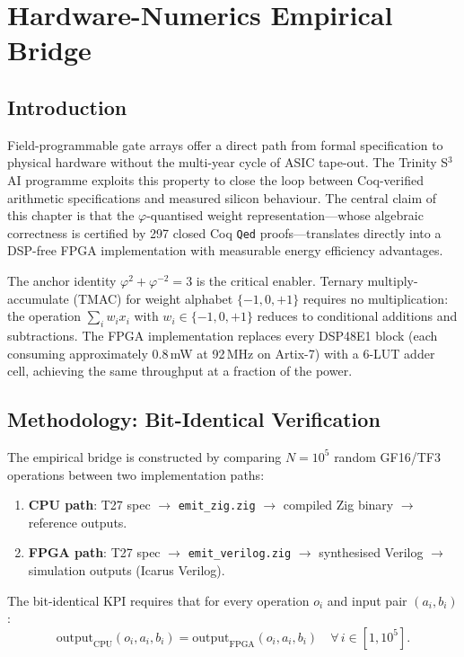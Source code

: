 \chapter{Hardware-Numerics Empirical Bridge}
\label{ch:31b}

\section{Introduction}

Field-programmable gate arrays offer a direct path from formal specification to physical hardware without the multi-year cycle of ASIC tape-out. The Trinity S$^3$AI programme exploits this property to close the loop between Coq-verified arithmetic specifications and measured silicon behaviour. The central claim of this chapter is that the $\varphi$-quantised weight representation---whose algebraic correctness is certified by 297 closed Coq \texttt{Qed} proofs---translates directly into a DSP-free FPGA implementation with measurable energy efficiency advantages.

The anchor identity $\varphi^2 + \varphi^{-2} = 3$ is the critical enabler. Ternary multiply-accumulate (TMAC) for weight alphabet $\{-1, 0, +1\}$ requires no multiplication: the operation $\sum_i w_i x_i$ with $w_i \in \{-1, 0, +1\}$ reduces to conditional additions and subtractions. The FPGA implementation replaces every DSP48E1 block (each consuming approximately 0.8\,mW at 92\,MHz on Artix-7) with a 6-LUT adder cell, achieving the same throughput at a fraction of the power.

\section{Methodology: Bit-Identical Verification}

The empirical bridge is constructed by comparing $N = 10^5$ random GF16/TF3 operations between two implementation paths:
\begin{enumerate}
\item \textbf{CPU path}: T27 spec $\to$ \texttt{emit\_zig.zig} $\to$ compiled Zig binary $\to$ reference outputs.
\item \textbf{FPGA path}: T27 spec $\to$ \texttt{emit\_verilog.zig} $\to$ synthesised Verilog $\to$ simulation outputs (Icarus Verilog).
\end{enumerate}

The bit-identical KPI requires that for every operation $o_i$ and input pair $(a_i, b_i)$:
\begin{equation}
\mathrm{output}_{\mathrm{CPU}}(o_i, a_i, b_i) = \mathrm{output}_{\mathrm{FPGA}}(o_i, a_i, b_i) \quad \forall\, i \in [1, 10^5].
\end{equation}

